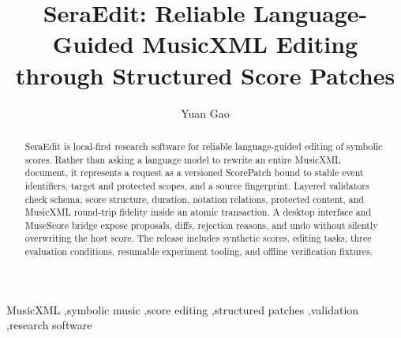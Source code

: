 \documentclass[preprint,12pt,a4paper]{elsarticle}
\begin{document}
\begin{frontmatter}

\title{SeraEdit: Reliable Language-Guided MusicXML Editing through Structured Score Patches}

\author[aff1]{Yuan Gao}
\address[aff1]{Zhejiang Conservatory of Music, No. 1 Zheyin Road, Zhuantang Street, Xihu District, Hangzhou, Zhejiang Province, China 310024}

\begin{abstract}
SeraEdit is local-first research software for reliable language-guided editing of
symbolic scores. Rather than asking a language model to rewrite an entire MusicXML
document, it represents a request as a versioned ScorePatch bound to stable event
identifiers, target and protected scopes, and a source fingerprint. Layered validators
check schema, score structure, duration, notation relations, protected content, and
MusicXML round-trip fidelity inside an atomic transaction. A desktop interface and
MuseScore bridge expose proposals, diffs, rejection reasons, and undo without silently
overwriting the host score. The release includes synthetic scores, editing tasks, three
evaluation conditions, resumable experiment tooling, and offline verification fixtures.
\end{abstract}

\begin{keyword}
MusicXML \sep symbolic music \sep score editing \sep structured patches \sep validation \sep research software
\end{keyword}
\end{frontmatter}
\end{document}
